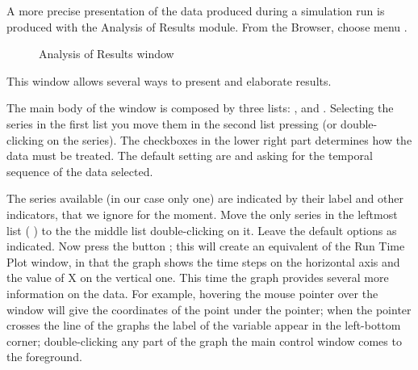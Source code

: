 \documentclass [11pt,a4paper] {book}
\begin{document}
A more precise presentation of the data produced during a simulation run is produced with
the Analysis of Results module. From the Browser, choose menu . 

\begin{figure}[ht]
  \centering
  \caption{Analysis of Results window}
  \label{fig:analysis}
\end{figure}

This window allows several ways to present and elaborate results. 

The main body of the
window is composed by three lists: ,  and
. Selecting the series in the first list you move them in the second list
pressing \menu{$>$} (or double-clicking on the series). The checkboxes in the lower right
part determines how the data must be treated. The default setting are 
and  asking for the temporal sequence of the data selected. 

The series available (in our case only one) are indicated by their label and other indicators, that we ignore for the moment. Move the only
series in the leftmost list ( ) to the the middle list double-clicking on it. Leave the default options
as indicated. Now press the button ; this will create an equivalent of
the Run Time Plot window, in that the graph shows the time steps on the horizontal axis
and the value of X on the vertical one. This time the graph provides several more
information on the data. For example, hovering the mouse pointer over the window will
give the coordinates of the point under the pointer; when the pointer crosses the line of the graphs the label of the variable appear in the left-bottom corner; double-clicking any part of the graph the main control window comes to the foreground.
\end{document}
